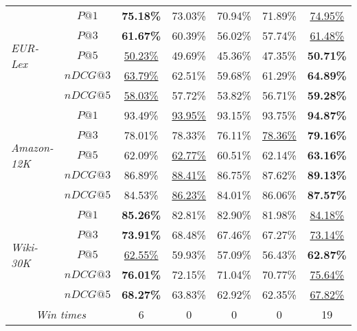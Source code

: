 \documentclass[runningheads]{llncs}
\begin{document}
\begin{table}[t]
\begin{tabular}{l|c|c|c|c|c|c}
\multirow{5}{*}{\textit{EUR-Lex}}	 &$P@1$ &\textbf{75.18\%} &  73.03\%&70.94\% & 71.89\% 	&  \underline{74.95\%}	  \\ 
		& $P@3$ & \textbf{61.67\%}& 60.39\% &56.02\% & 57.74\% &  \underline{61.48\%}	  \\
		& $P@5$ & \underline{50.23\%}& 49.69\% &45.36\% & 47.35\% &  \textbf{50.71\%} 	 \\ \cline{2-7}
		& $nDCG@3$ & \underline{63.79\%}& 62.51\% &59.68\% & 61.29\% &  \textbf{64.89\%}	  \\
		& $nDCG@5$ & \underline{58.03\%}& 57.72\% &53.82\% & 56.71\% &  \textbf{59.28\%} 	 \\ \hline \hline
		\multirow{5}{*}{\textit{Amazon-12K}}	 &$P@1$ & 93.49\%& \underline{93.95\%} &93.15\% & 93.75\% &  \textbf{94.87\%} 	  \\ 
& $P@3$ & 78.01\%& 78.33\% & 76.11\%& \underline{78.36\%} &  \textbf{79.16\%}	 \\
& $P@5$ & 62.09\%& \underline{62.77\%} &60.51\% & 62.14\% &  \textbf{63.16\%} 	  \\ \cline{2-7}
& $nDCG@3$ & 86.89\%& \underline{88.41\%}& 86.75\%& 87.62\% &  \textbf{89.13\%}	 \\
& $nDCG@5$ & 84.53\%& \underline{86.23\%} &84.01\% & 86.06\% &  \textbf{87.57\%} 	  \\ \hline	\hline
		\multirow{5}{*}{\textit{Wiki-30K}}	 &$P@1$ & \textbf{85.26\%}& 82.81\% & 82.90\%& 81.98\% &  \underline{84.18\%} 	  \\ 
		& $P@3$ & \textbf{73.91\%}& 68.48\% & 67.46\%& 67.27\% & \underline{73.14\%} 	 \\
		& $P@5$ & \underline{62.55\%}& 59.93\% &57.09\% & 56.43\% &  \textbf{62.87\%} 	  \\ \cline{2-7}
		& $nDCG@3$ & \textbf{76.01\%}& 72.15\% & 71.04\%& 70.77\% & \underline{75.64\%} 	 \\
		& $nDCG@5$ & \textbf{68.27\%}& 63.83\% & 62.92\%& 62.35\% & \underline{67.82\%} 	  \\ \hline\hline
\multicolumn{2}{c|}{\textit{Win times}} & 6 & 0&0&0 & 19\\
		\hline	
	\end{tabular}
\end{table}
\end{document}

